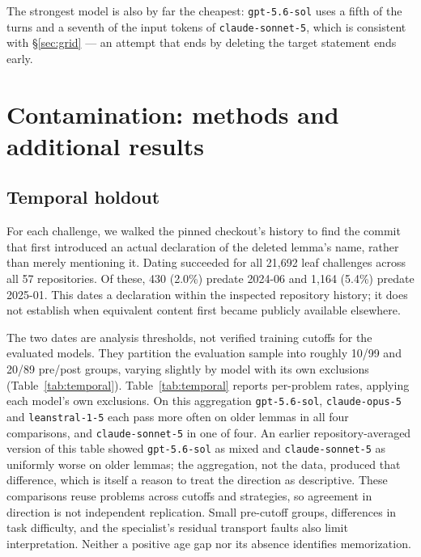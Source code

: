 \documentclass{article}
\begin{document}
The strongest model is also by far the cheapest: \texttt{gpt-5.6-sol} uses a fifth of the turns
and a seventh of the input tokens of \texttt{claude-sonnet-5}, which is consistent with
\S\ref{sec:grid} --- an attempt that ends by deleting the target statement ends early.

\section{Contamination: methods and additional results}
\label{app:contamination}

\subsection{Temporal holdout}
\label{app:temporal}

For each challenge, we walked the pinned checkout's history to find the commit that first
introduced an actual declaration of the deleted lemma's name, rather than merely mentioning
it. Dating succeeded for all 21{,}692 leaf challenges across all 57 repositories. Of these,
430 (2.0\%) predate 2024-06 and 1{,}164 (5.4\%) predate 2025-01. This dates a declaration
within the inspected repository history; it does not establish when equivalent content
first became publicly available elsewhere.

The two dates are analysis thresholds, not verified training cutoffs for the evaluated
models. They partition the evaluation sample into roughly 10/99 and 20/89 pre/post groups,
varying slightly by model with its own exclusions (Table~\ref{tab:temporal}). Table~\ref{tab:temporal} reports per-problem rates, applying each model's own exclusions.
On this aggregation \texttt{gpt-5.6-sol}, \texttt{claude-opus-5} and \texttt{leanstral-1-5}
each pass more often on older lemmas in all four comparisons, and \texttt{claude-sonnet-5}
in one of four. An earlier repository-averaged version of this table showed
\texttt{gpt-5.6-sol} as mixed and \texttt{claude-sonnet-5} as uniformly worse on older
lemmas; the aggregation, not the data, produced that difference, which is itself a reason
to treat the direction as descriptive. These comparisons
reuse problems across cutoffs and strategies, so agreement in direction is not independent
replication. Small pre-cutoff groups, differences in task difficulty, and the specialist's
residual transport faults also limit interpretation. Neither a positive age gap nor its
absence identifies memorization.
\end{document}
